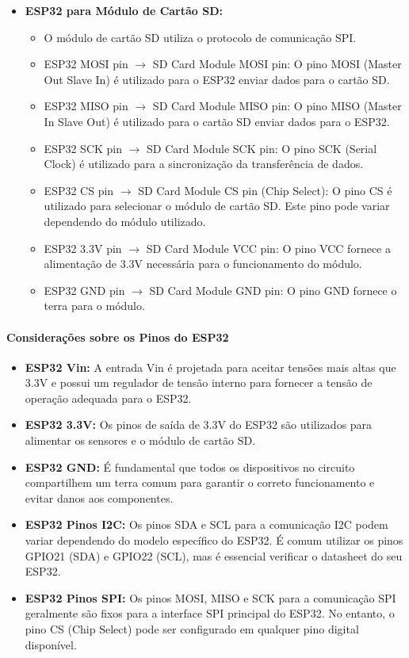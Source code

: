 \begin{itemize}
    \item   \textbf{ESP32 para Módulo de Cartão SD:}
    \begin{itemize}
        \item   O módulo de cartão SD utiliza o protocolo de comunicação SPI.
        \item   ESP32 MOSI pin $\rightarrow$ SD Card Module MOSI pin: O pino MOSI (Master Out Slave In) é utilizado para o ESP32 enviar dados para o cartão SD.
        \item   ESP32 MISO pin $\rightarrow$ SD Card Module MISO pin: O pino MISO (Master In Slave Out) é utilizado para o cartão SD enviar dados para o ESP32.
        \item   ESP32 SCK pin $\rightarrow$ SD Card Module SCK pin: O pino SCK (Serial Clock) é utilizado para a sincronização da transferência de dados.
        \item   ESP32 CS pin $\rightarrow$ SD Card Module CS pin (Chip Select): O pino CS é utilizado para selecionar o módulo de cartão SD. Este pino pode variar dependendo do módulo utilizado.
        \item   ESP32 3.3V pin $\rightarrow$ SD Card Module VCC pin: O pino VCC fornece a alimentação de 3.3V necessária para o funcionamento do módulo.
        \item   ESP32 GND pin $\rightarrow$ SD Card Module GND pin: O pino GND fornece o terra para o módulo.
    \end{itemize}
\end{itemize}

\paragraph{Considerações sobre os Pinos do ESP32}

\begin{itemize}
    \item   \textbf{ESP32 Vin:} A entrada Vin é projetada para aceitar tensões mais altas que 3.3V e possui um regulador de tensão interno para fornecer a tensão de operação adequada para o ESP32.
    \item   \textbf{ESP32 3.3V:} Os pinos de saída de 3.3V do ESP32 são utilizados para alimentar os sensores e o módulo de cartão SD.
    \item   \textbf{ESP32 GND:} É fundamental que todos os dispositivos no circuito compartilhem um terra comum para garantir o correto funcionamento e evitar danos aos componentes.
    \item   \textbf{ESP32 Pinos I2C:} Os pinos SDA e SCL para a comunicação I2C podem variar dependendo do modelo específico do ESP32. É comum utilizar os pinos GPIO21 (SDA) e GPIO22 (SCL), mas é essencial verificar o datasheet do seu ESP32.
    \item   \textbf{ESP32 Pinos SPI:} Os pinos MOSI, MISO e SCK para a comunicação SPI geralmente são fixos para a interface SPI principal do ESP32. No entanto, o pino CS (Chip Select) pode ser configurado em qualquer pino digital disponível.
\end{itemize}


